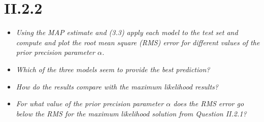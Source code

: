 \documentclass[12pt, a4paper]{article}
\begin{document}
\section{II.2.2}
\begin{itemize}
\item \textit{Using the MAP estimate and (3.3) apply each model to the test
set and compute and plot the root mean square (RMS) error for different values
of the prior precision parameter $\alpha$.}
\item \textit{Which of the three models seem to provide
the best prediction?}
\item \textit{How do the results compare with the maximum likelihood
results?}
\item \textit{For what value of the prior precision parameter $\alpha$ does the RMS error go below the RMS for the maximum likelihood solution from Question II.2.1?}
\end{itemize}
\end{document}
